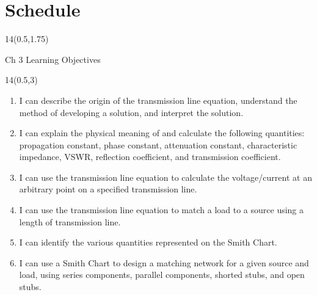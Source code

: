 


\section{Schedule}
\renewcommand{\arraystretch}{1}
\begin{frame}{}
	\begin{textblock}{14}(0.5,1.75)
	\def\myfontsize{footnotesize}
	
	\end{textblock}
\end{frame}


\begin{frame}{Ch 3 Learning Objectives}
	\begin{textblock}{14}(0.5,3)
	\begin{enumerate}[{3}.1]
		\item \alert{I can describe the origin of the transmission line equation, understand the method of developing a solution, and interpret the solution.}
		\item I can explain the physical meaning of and calculate the following quantities: propagation constant, phase constant, attenuation constant, characteristic impedance, VSWR, reflection coefficient, and transmission coefficient.
		\item  I can use the transmission line equation to calculate the voltage/current at an arbitrary point on a specified transmission line.
		\item  I can use the transmission line equation to match a load to a source using a length of transmission line.
		\item I can identify the various quantities represented on the Smith Chart.
		\item I can use a Smith Chart to design a matching network for a given source and load, using series components, parallel components, shorted stubs, and open stubs.
	\end{enumerate}
	\end{textblock}
\end{frame}


